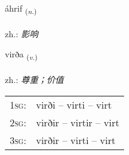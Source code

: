 \documentclass[frontgrid, backgrid]{flacards}\usepackage[]{graphicx}\usepackage[]{xcolor}
\begin{document}
{áhrif \small{\textsubscript{(\textit{n.})}} \\[1ex] %
\textphonetic{[auːr̥ɪv]} \\
zh.: \emph{影响} \\  [2ex]
\renewcommand*{\arraystretch}{0.8}
}

\renewcommand{\flhead}{\vskip5pt \fboxsep=0pt {\small\bfseries\footnotesize Sagnorð | 动词}}
\renewcommand{\fcfoot}{\vskip5pt \fboxsep=0pt \hspace{2pt}{\small\bfseries\footnotesize 1K}}

\renewcommand{\blhead}{\vskip5pt {\small\bfseries\footnotesize Sagnorð | 动词 }}
\renewcommand{\bcfoot}{\vskip5pt \hspace{2pt}{\small\bfseries\footnotesize 1K}}


{virða \small{\textsubscript{(\textit{v.})}} \\[1ex] %
\textphonetic{[vɪrða]} \\
zh.: \emph{尊重；价值} \\  [2ex]
\renewcommand*{\arraystretch}{0.8}
\begin{tabular}{p{1cm}l}
\textsc{1sg}: & virði -- virti -- virt \\ 
\textsc{2sg}: & virðir -- virtir -- virt \\ 
\textsc{3sg}: & virðir -- virti -- virt \\ 
\end{tabular}
}

\renewcommand{\flhead}{\vskip5pt \fboxsep=0pt {\small\bfseries\footnotesize Sagnorð | 动词}}
\renewcommand{\fcfoot}{\vskip5pt \fboxsep=0pt \hspace{2pt}{\small\bfseries\footnotesize 1K}}

\renewcommand{\blhead}{\vskip5pt {\small\bfseries\footnotesize Sagnorð | 动词 }}
\renewcommand{\bcfoot}{\vskip5pt \hspace{2pt}{\small\bfseries\footnotesize 1K}}
\end{document}
